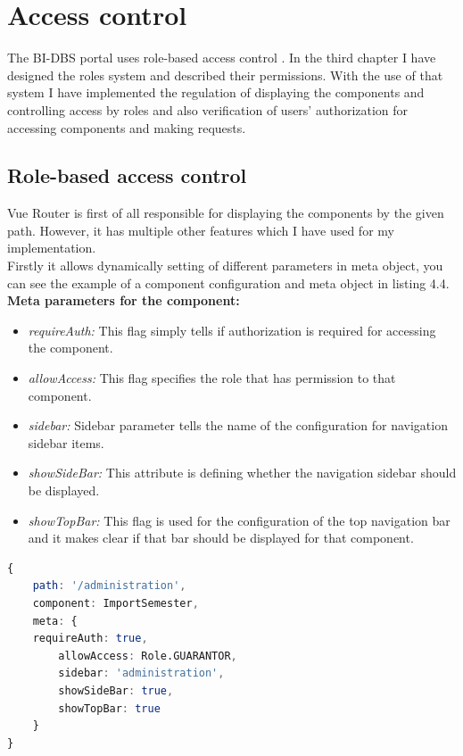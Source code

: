 \section{Access control} The BI-DBS portal uses role-based access control \cite{role-auth}. In the third chapter I have designed the roles system and described their permissions. With the use of that system I have implemented the regulation of displaying the components and controlling access by roles and also verification of users' authorization for accessing components and making requests.

\subsection{Role-based access control} Vue Router is first of all responsible for displaying the components by the given path. However, it has multiple other features which I have used for my implementation.\\
Firstly it allows dynamically setting of different parameters in meta object, you can see the example of a component configuration and meta object in listing 4.4.\\

\noindent \textbf{Meta parameters for the component:}

\begin{itemize}
    \item \emph{requireAuth:} This flag simply tells if authorization is required for accessing the component.
    \item \emph{allowAccess:} This flag specifies the role that has permission to that component.
    \item \emph{sidebar:} Sidebar parameter tells the name of the configuration for navigation sidebar items.
    \item \emph{showSideBar:} This attribute is defining whether the navigation sidebar should be displayed.
    \item \emph{showTopBar:} This flag is used for the configuration of the top navigation bar and it makes clear if that bar should be displayed for that component.
\end{itemize}

\begin{lstlisting}[language=Octave, caption=The example of component configuration in Router]
{
    path: '/administration',
    component: ImportSemester,
    meta: {
    requireAuth: true,
        allowAccess: Role.GUARANTOR,
        sidebar: 'administration',
        showSideBar: true,
        showTopBar: true
    }
}
\end{lstlisting}

